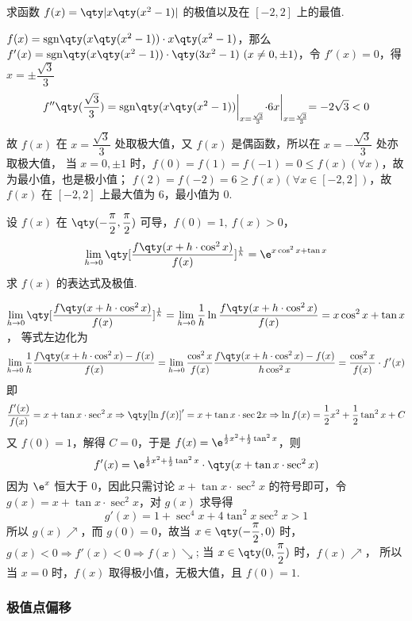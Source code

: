 \begin{example}
    求函数 $f(x)=\qty|x\qty(x^2-1)|$ 的极值以及在 $[-2,2]$ 上的最值.
\end{example}
\begin{solution}
    $f(x)=\mathrm{sgn}\qty(x\qty(x^2-1))\cdot x\qty(x^2-1)$，那么 $f'(x)=\mathrm{sgn}\qty(x\qty(x^2-1))\cdot\qty(3x^2-1)~ (x\neq0,\pm1)$，令 $f'(x)=0$，得
    $x=\pm\dfrac{\sqrt{3}}{3}$
    $$f''\qty(\dfrac{\sqrt{3}}{3})=\mathrm{sgn}\qty(x\qty(x^2-1))\biggl |_{x=\frac{\sqrt{3}}{3}}\cdot 6x\biggl |_{x=\frac{\sqrt{3}}{3}}=-2\sqrt{3}<0$$
    故 $f(x)$ 在 $x=\dfrac{\sqrt{3}}{3}$ 处取极大值，又 $f(x)$ 是偶函数，所以在 $x=-\dfrac{\sqrt{3}}{3}$ 处亦取极大值，
    当 $x=0,\pm1$ 时，$f(0)=f(1)=f(-1)=0\leqslant f(x)(\forall x)$，故为最小值，也是极小值；
    $f(2)=f(-2)=6\geqslant f(x)(\forall x\in[-2,2])$，故 $f(x)$ 在 $[-2,2]$ 上最大值为 6，最小值为 0.
\end{solution}

\begin{example}
    设 $f(x)$ 在 $\qty(-\dfrac{\pi}{2},\dfrac{\pi}{2})$ 可导，$f(0)=1,~f(x)>0$，$$\displaystyle\lim_{h\to0}\qty[\dfrac{f\qty(x+h\cdot \cos^2x)}{f(x)}]^{\frac{1}{h}}=\e^{x\cos^2x+\tan x}$$
    求 $f(x)$ 的表达式及极值.
\end{example}
\begin{solution}
    $\displaystyle\lim_{h\to0}\qty[\dfrac{f\qty(x+h\cdot \cos^2x)}{f(x)}]^{\frac{1}{h}}=\lim_{h\to0}\dfrac{1}{h}\ln\dfrac{f\qty(x+h\cdot\cos^2x)}{f(x)}=x\cos^2x+\tan x$，
    等式左边化为 $$\lim_{h\to0}\dfrac{1}{h}\dfrac{f\qty(x+h\cdot\cos^2x)-f(x)}{f(x)}=\lim_{h\to0}\dfrac{\cos^2x}{f(x)}\dfrac{f\qty(x+h\cdot\cos^2x)-f(x)}{h\cos^2x}=\dfrac{\cos^2x}{f(x)}\cdot f'(x)$$
    即 $$\dfrac{f'(x)}{f(x)}=x+\tan x\cdot\sec^2x\Rightarrow \qty[\ln f(x)]'=x+\tan x\cdot\sec2x\Rightarrow \ln f(x)=\dfrac{1}{2}x^2+\dfrac{1}{2}\tan^2x+C$$
    又 $f(0)=1$，解得 $C=0$，于是 
    $f(x)=\e^{\frac{1}{2}x^2+\frac{1}{2}\tan^2x}$，则 
    $$f'(x)=\e^{\frac{1}{2}x^2+\frac{1}{2}\tan^2x}\cdot\qty(x+\tan x\cdot\sec^2x)$$
    因为 $\e^{x}$ 恒大于 0，因此只需讨论 $x+\tan x\cdot\sec^2x$ 的符号即可，令 $g(x)=x+\tan x\cdot\sec^2x$，对 $g(x)$ 求导得 $$g'(x)=1+\sec^4x+4\tan^2x\sec^2x>1$$
    所以 $g(x)\nearrow$，而 $g(0)=0$，故当 $x\in\qty(-\dfrac{\pi}{2},0)$ 时，$g(x)<0\Rightarrow f'(x)<0\Rightarrow f(x)\searrow$; 当 $x\in\qty(0,\dfrac{\pi}{2})$ 时，$f(x)\nearrow$，
    所以当 $x=0$ 时，$f(x)$ 取得极小值，无极大值，且 $f(0)=1.$
\end{solution}

\subsubsection{极值点偏移}

